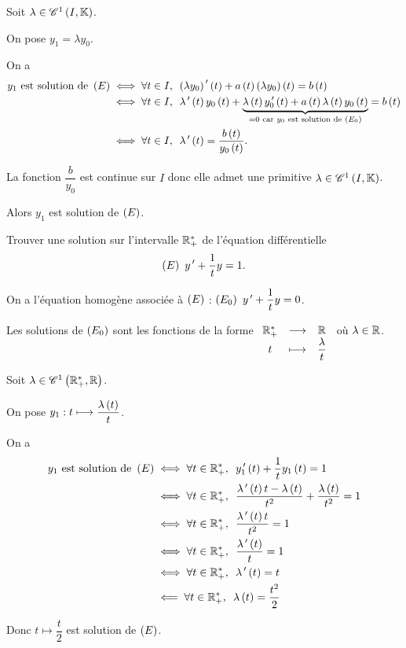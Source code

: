 \begin{dem}
Soit \(\lambda\in\mathscr{C}^{1}\left(I,\mathbb{K}\right)\).

On pose \(y_1=\lambda y_0\).

On a \[\begin{aligned}
y_1\text{ est solution de }\paren{E}&\ssi\quantifs{\forall t\in I}\paren{\lambda y_0}\prim\paren{t}+a\paren{t}\paren{\lambda y_0}\paren{t}=b\paren{t} \\
&\ssi\quantifs{\forall t\in I}\lambda\prim\paren{t}y_0\paren{t}+\underbrace{\lambda\paren{t}y_0\prim\paren{t}+a\paren{t}\lambda\paren{t}y_0\paren{t}}_{=0\text{ car }y_0\text{ est solution de }\paren{E_0}}=b\paren{t} \\
&\ssi\quantifs{\forall t\in I}\lambda\prim\paren{t}=\dfrac{b\paren{t}}{y_0\paren{t}}.
\end{aligned}\]

La fonction \(\dfrac{b}{y_0}\) est continue sur \(I\) donc elle admet une primitive \(\lambda\in\mathscr{C}^{1}\left(I,\mathbb{K}\right)\).

Alors \(y_1\) est solution de \(\left(E\right)\).
\end{dem}

\begin{exoex}
Trouver une solution sur l'intervalle \(\mathbb{R}_+^*\) de l'équation différentielle \[\left(E\right)~y^{\,\prime}+\dfrac{1}{t}y=1.\]
\end{exoex}

\begin{corr}
On a l'équation homogène associée à \(\left(E\right)\) : \(\left(E_0\right)~y^{\,\prime}+\dfrac{1}{t}y=0\).

Les solutions de \(\left(E_0\right)\) sont les fonctions de la forme \(\begin{array}[t]{ccc}\mathbb{R}_+^* & \longrightarrow & \mathbb{R} \\ t & \longmapsto & \dfrac{\lambda}{t}\end{array}\) où \(\lambda\in\mathbb{R}\).

Soit \(\lambda\in\mathscr{C}^{1}\left(\mathbb{R}_+^*,\mathbb{R}\right)\).

On pose \(y_1:t\longmapsto\dfrac{\lambda\left(t\right)}{t}\).

On a \[\begin{aligned}
y_1\text{ est solution de }\paren{E}&\ssi\quantifs{\forall t\in\Rps}y_1\prim\paren{t}+\dfrac{1}{t}y_1\paren{t}=1 \\
&\ssi\quantifs{\forall t\in\Rps}\dfrac{\lambda\prim\paren{t}t-\lambda\paren{t}}{t^2}+\dfrac{\lambda\paren{t}}{t^2}=1 \\
&\ssi\quantifs{\forall t\in\Rps}\dfrac{\lambda\prim\paren{t}t}{t^2}=1 \\
&\ssi\quantifs{\forall t\in\Rps}\dfrac{\lambda\prim\paren{t}}{t}=1 \\
&\ssi\quantifs{\forall t\in\Rps}\lambda\prim\paren{t}=t \\
&\impr\quantifs{\forall t\in\Rps}\lambda\paren{t}=\dfrac{t^2}{2}
\end{aligned}\]

Donc \(t\mapsto\dfrac{t}{2}\) est solution de \(\left(E\right)\).
\end{corr}

